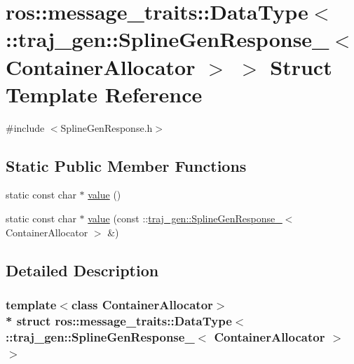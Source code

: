 \hypertarget{structros_1_1message__traits_1_1_data_type_3_01_1_1traj__gen_1_1_spline_gen_response___3_01_container_allocator_01_4_01_4}{}\section{ros\+:\+:message\+\_\+traits\+:\+:Data\+Type$<$ \+:\+:traj\+\_\+gen\+:\+:Spline\+Gen\+Response\+\_\+$<$ Container\+Allocator $>$ $>$ Struct Template Reference}
\label{structros_1_1message__traits_1_1_data_type_3_01_1_1traj__gen_1_1_spline_gen_response___3_01_container_allocator_01_4_01_4}


{\ttfamily \#include $<$Spline\+Gen\+Response.\+h$>$}

\subsection*{Static Public Member Functions}
\begin{DoxyCompactItemize}
\item 
static const char $\ast$ \hyperlink{structros_1_1message__traits_1_1_data_type_3_01_1_1traj__gen_1_1_spline_gen_response___3_01_container_allocator_01_4_01_4_af738ed3697fc5c3607f5777166502bbf}{value} ()
\item 
static const char $\ast$ \hyperlink{structros_1_1message__traits_1_1_data_type_3_01_1_1traj__gen_1_1_spline_gen_response___3_01_container_allocator_01_4_01_4_a45333b91e9108b4ab9094322fcc1243b}{value} (const \+::\hyperlink{structtraj__gen_1_1_spline_gen_response__}{traj\+\_\+gen\+::\+Spline\+Gen\+Response\+\_\+}$<$ Container\+Allocator $>$ \&)
\end{DoxyCompactItemize}


\subsection{Detailed Description}
\subsubsection*{template$<$class Container\+Allocator$>$\\*
struct ros\+::message\+\_\+traits\+::\+Data\+Type$<$ \+::traj\+\_\+gen\+::\+Spline\+Gen\+Response\+\_\+$<$ Container\+Allocator $>$ $>$}



